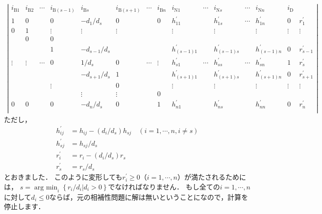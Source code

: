 \documentclass[a4paper]{jsarticle}
\begin{document}
\begin{align*}
\left|\begin{array}{c|c|c|c|c|c|c|c|c|c|c|c|c|c|c}
i_{\mathrm{B}1} & i_{\mathrm{B}2} & \cdots & i_{\mathrm{B}(s-1)} & i_{\mathrm{B}s} & i_{\mathrm{B}(s+1)} & \cdots & i_{\mathrm{B}n} & i_{\mathrm{N}1} & \cdots & i_{\mathrm{N}s} & \cdots & i_{\mathrm{N}n} & i_{\mathrm{D}} & \\
\hline
1      & 0      &        & 0      &-d_{1}/d_{s}  & 0      &        & 0      & h_{11}^{\prime}    &        & h_{1s}^{\prime}    & \cdots & h_{1n}^{\prime}    & 0      & r_{1}^{\prime} \\
0      & 1      &        & \vdots & \vdots      & \vdots &        &        & \vdots          &        & \vdots          &        & \vdots          & \vdots & \vdots \\
       & 0      &        & 0      &             &        &        &        &                 &        &                 &        &                 &        &        \\
       &        &        & 1      &-d_{s-1}/d_{s} &        &        &        & h_{(s-1)1}^{\prime} &        & h_{(s-1)s}^{\prime} &        & h_{(s-1)n}^{\prime} & 0      & r_{s-1}^{\prime} \\
\vdots & \vdots & \cdots & 0      & 1/d_{s}      & 0      & \cdots & \vdots & h_{s1}^{\prime}    & \cdots & h_{ss}^{\prime}    & \cdots & h_{sn}^{\prime}    & 1      & r_{s}^{\prime} \\
       &        &        &        &-d_{s+1}/d_{s} & 1      &        &        & h_{(s+1)1}^{\prime} &        & h_{(s+1)s}^{\prime} &        & h_{(s+1)n}^{\prime} & 0      & r_{s+1}^{\prime} \\
       &        &        & \vdots &             & 0      &        &        & \vdots          &        & \vdots          &        & \vdots          & \vdots & \vdots \\
       &        &        &        & \vdots      & \vdots &        & 0      &                 &        &                 &        &                 &        &        \\
0      & 0      &        & 0      &-d_{n}/d_{s}  & 0      &        & 1      & h_{n1}^{\prime}    &        & h_{ns}^{\prime}    &        & h_{nn}^{\prime}    & 0      & r_{n}^{\prime} \\
\end{array}\right|
\end{align*}
ただし，
\begin{align*}
h_{ij}^{\prime}&=h_{ij}-(d_{i}/d_{s})h_{sj} \quad (i=1,\cdots,n, i\neq s) \\
h_{sj}^{\prime}&=h_{sj}/d_{s} \\
r_{i}^{\prime}&=r_{i}-(d_{i}/d_{s})r_{s} \\
r_{s}^{\prime}&=r_{s}/d_{s}
\end{align*}
とおきました．
このように変形しても$r_{i}^{\prime}\geq 0$（$i=1,\cdots,n$）が満たされるためには，
$s=\mathop{\mathrm{arg~min}}_{i}\left\{\left.r_{i}/d_{i}\right|d_{i}>0 \right\}$でなければなりません．
もし全ての$i=1,\cdots,n$に対して$d_{i}\leq 0$ならば，元の相補性問題に解は無いということになので，計算を停止します．
\end{document}
